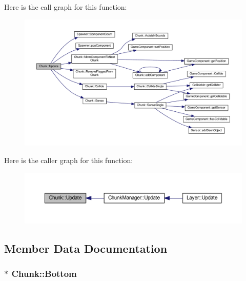 Here is the call graph for this function\-:\nopagebreak
\begin{figure}[H]
\begin{center}
\leavevmode
\includegraphics[width=350pt]{class_chunk_a98a8a36b0197668d37994f77b2952084_cgraph}
\end{center}
\end{figure}




Here is the caller graph for this function\-:\nopagebreak
\begin{figure}[H]
\begin{center}
\leavevmode
\includegraphics[width=350pt]{class_chunk_a98a8a36b0197668d37994f77b2952084_icgraph}
\end{center}
\end{figure}




\subsection{Member Data Documentation}
\hypertarget{class_chunk_ac9ac53a727ae045b6f751ec6a68bcaca}{
\subsubsection[{Bottom}]{$\ast$ Chunk\-::\-Bottom\hspace{0.3cm}{\ttfamily [private]}}}\label{class_chunk_ac9ac53a727ae045b6f751ec6a68bcaca}


